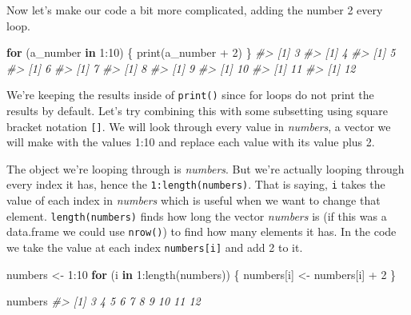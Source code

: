 \documentclass[
]{krantz}
\makeatletter
\newenvironment{Shaded}{\begin{snugshade}}{\end{snugshade}}
\newcommand{\CommentTok}[1]{\textcolor[rgb]{0.37,0.37,0.37}{\textit{#1}}}
\newcommand{\ControlFlowTok}[1]{\textcolor[rgb]{0.27,0.27,0.27}{\textbf{#1}}}
\newcommand{\DecValTok}[1]{\textcolor[rgb]{0.06,0.06,0.06}{#1}}
\newcommand{\FunctionTok}[1]{\textcolor[rgb]{0,0,0}{#1}}
\newcommand{\NormalTok}[1]{#1}
\newcommand{\OtherTok}[1]{\textcolor[rgb]{0.37,0.37,0.37}{#1}}
\newcommand{\SpecialCharTok}[1]{\textcolor[rgb]{0,0,0}{#1}}
\newenvironment{kframe}{%
\medskip{}
\setlength{\fboxsep}{.8em}
 \def\at@end@of@kframe{}%
 \ifinner\ifhmode%
  \def\at@end@of@kframe{\end{minipage}}%
  \begin{minipage}{\columnwidth}%
 \fi\fi%
 \def\FrameCommand##1{\hskip\@totalleftmargin \hskip-\fboxsep
 \colorbox{shadecolor}{##1}\hskip-\fboxsep
     \hskip-\linewidth \hskip-\@totalleftmargin \hskip\columnwidth}%
 \MakeFramed {\advance\hsize-\width
   \@totalleftmargin\z@ \linewidth\hsize
   \@setminipage}}%
 {\par\unskip\endMakeFramed%
 \at@end@of@kframe}
\renewenvironment{Shaded}{\begin{kframe}}{\end{kframe}}
\makeatother
\begin{document}
Now let's make our code a bit more complicated, adding the number 2 every loop.

\begin{Shaded}
\begin{Highlighting}[]
\ControlFlowTok{for}\NormalTok{ (a\_number }\ControlFlowTok{in} \DecValTok{1}\SpecialCharTok{:}\DecValTok{10}\NormalTok{) \{}
   \FunctionTok{print}\NormalTok{(a\_number }\SpecialCharTok{+} \DecValTok{2}\NormalTok{)}
\NormalTok{\}}
\CommentTok{\#\textgreater{} [1] 3}
\CommentTok{\#\textgreater{} [1] 4}
\CommentTok{\#\textgreater{} [1] 5}
\CommentTok{\#\textgreater{} [1] 6}
\CommentTok{\#\textgreater{} [1] 7}
\CommentTok{\#\textgreater{} [1] 8}
\CommentTok{\#\textgreater{} [1] 9}
\CommentTok{\#\textgreater{} [1] 10}
\CommentTok{\#\textgreater{} [1] 11}
\CommentTok{\#\textgreater{} [1] 12}
\end{Highlighting}
\end{Shaded}

We're keeping the results inside of \texttt{print()} since for loops do not print the results by default. Let's try combining this with some subsetting using square bracket notation \texttt{{[}{]}}. We will look through every value in \emph{numbers}, a vector we will make with the values 1:10 and replace each value with its value plus 2.

The object we're looping through is \emph{numbers}. But we're actually looping through every index it has, hence the \texttt{1:length(numbers)}. That is saying, \texttt{i} takes the value of each index in \emph{numbers} which is useful when we want to change that element. \texttt{length(numbers)} finds how long the vector \emph{numbers} is (if this was a data.frame we could use \texttt{nrow()}) to find how many elements it has. In the code we take the value at each index \texttt{numbers{[}i{]}} and add 2 to it.

\begin{Shaded}
\begin{Highlighting}[]
\NormalTok{numbers }\OtherTok{\textless{}{-}} \DecValTok{1}\SpecialCharTok{:}\DecValTok{10}
\ControlFlowTok{for}\NormalTok{ (i }\ControlFlowTok{in} \DecValTok{1}\SpecialCharTok{:}\FunctionTok{length}\NormalTok{(numbers)) \{}
\NormalTok{  numbers[i] }\OtherTok{\textless{}{-}}\NormalTok{ numbers[i] }\SpecialCharTok{+} \DecValTok{2}
\NormalTok{\}}
\end{Highlighting}
\end{Shaded}

\begin{Shaded}
\begin{Highlighting}[]
\NormalTok{numbers}
\CommentTok{\#\textgreater{}  [1]  3  4  5  6  7  8  9 10 11 12}
\end{Highlighting}
\end{Shaded}
\end{document}
